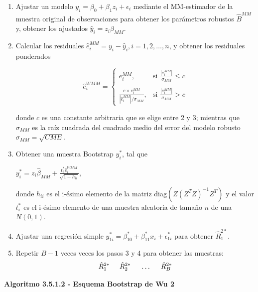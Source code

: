 \begin{enumerate}
	\item  Ajustar un modelo $y_{i} = \beta_{0} +\beta_{1}z_{i} + \epsilon_{i}$  mediante el MM-estimador de la muestra original de observaciones para obtener los parámetros robustos $\hat{B}^{MM}$ y, obtener los ajustados $\hat{y}_{i}=z_{i}\hat{\beta}_{MM}$.
	
	\item  Calcular los residuales $ \hat{e}^{MM}_{i} = y_{i}-\hat{y}_{i},i = 1,2, \dots, n$, y obtener los residuales ponderados
	\begin{center}
	\[
	\hat{e}^{WMM}_{i} =
	\begin{cases}
		e^{MM}_{i}, & \text{si } \frac{|e^{MM}_{i}|}{\sigma_{MM}} \leq c \\ \\
		\frac{c \times e^{MM}_{i}}{ | \hat{e}^{MM}_{i} | /\sigma_{MM}},     & \text{si } \frac{|e^{MM}_{i}|}{\sigma_{MM}} > c
	\end{cases}
	\]
	\end{center} 
	donde $c$ es una constante arbitraria que se elige entre 2 y 3; mientras que $\sigma_{MM}$ es la
	raíz cuadrada del cuadrado medio del error del modelo robusto $\sigma_{MM} = \sqrt{CME}$.

	\item Obtener una muestra Bootstrap $y^{*}_{i}$, tal que 
	\begin{center}
		$y^{*}_{i} =z_{i}\hat{\beta}_{MM} + \frac{t^{*}_{i}\hat{e}^{WMM}_{i}}{\sqrt{1-h_{ii}}} $,
	\end{center}
	donde $h_{ii}$ es el i-ésimo elemento de la matriz diag$(Z(Z^{T}Z)^{-1} Z^{T})$ y el valor $t^{*}_{i}$ es el
	i-ésimo elemento de una muestra aleatoria de tamaño $n$ de una $N(0,1)$.
	
	\item  Ajustar una regresión simple $ y^{*}_{1i} = \beta^{*}_{10} +\beta^{*}_{11}x_{i} + \epsilon^{*}_{1i} $ para obtener $ \hat{R}^{2*}_{1} $.
	
		\item Repetir $B - 1$ veces veces los pasos 3 y 4 para obtener las muestras:
	\[
	\hat{R}^{2*}_{1} \hspace{.5cm} \hat{R}^{2*}_{2} \hspace{.5cm} \dots \hspace{.5cm} \hat{R}^{2*}_{B}
	\]
\end{enumerate}


\textbf{Algoritmo 3.5.1.2 - Esquema Bootstrap de Wu 2}

